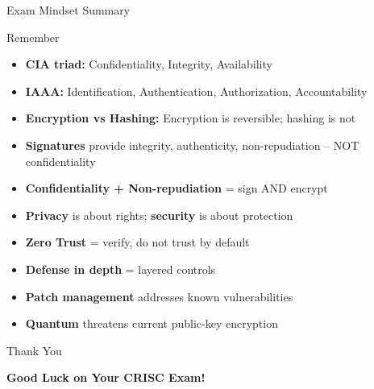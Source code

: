 \documentclass{beamer}
\begin{document}
	\begin{frame}{Exam Mindset Summary}
		\begin{block}{Remember}
			\begin{itemize}
				\item \textbf{CIA triad:} Confidentiality, Integrity, Availability
				\item \textbf{IAAA:} Identification, Authentication, Authorization, Accountability
				\item \textbf{Encryption vs Hashing:} Encryption is reversible; hashing is not
				\item \textbf{Signatures} provide integrity, authenticity, non-repudiation -- NOT confidentiality
				\item \textbf{Confidentiality + Non-repudiation} = sign AND encrypt
				\item \textbf{Privacy} is about rights; \textbf{security} is about protection
				\item \textbf{Zero Trust} = verify, do not trust by default
				\item \textbf{Defense in depth} = layered controls
				\item \textbf{Patch management} addresses known vulnerabilities
				\item \textbf{Quantum} threatens current public-key encryption
			\end{itemize}
		\end{block}
	\end{frame}
	
	\begin{frame}{Thank You}
		\begin{center}
			{\Huge \textbf{Good Luck on Your CRISC Exam!}}
		\end{center}
	\end{frame}
	
\end{document}
